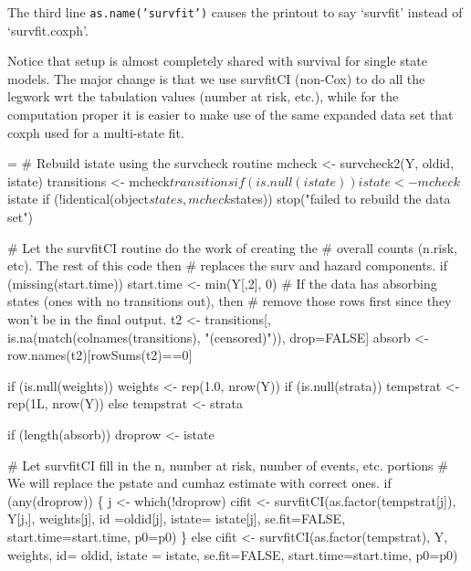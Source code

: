 \documentclass{article}
\newcommand{\code}[1]{\texttt{#1}}
\begin{document}
The third line \code{as.name('survfit')} causes the printout to say
`survfit' instead of `survfit.coxph'.                              %

Notice that setup is almost completely shared with survival for single state
models.  The major change is that we use survfitCI (non-Cox) to do all the
legwork wrt the tabulation values (number at risk, etc.),
while for the computation proper it is easier to make use of the same
expanded data set that coxph used for a multi-state fit.

\begin{nwchunk}
=
 # Rebuild istate using the survcheck routine
 mcheck <- survcheck2(Y, oldid, istate)
 transitions <- mcheck$transitions
 if (is.null(istate)) istate <- mcheck$istate
 if (!identical(object$states, mcheck$states))
     stop("failed to rebuild the data set")
 
 # Let the survfitCI routine do the work of creating the
 #  overall counts (n.risk, etc).  The rest of this code then
 #  replaces the surv and hazard components.
 if (missing(start.time)) start.time <- min(Y[,2], 0)
 # If the data has absorbing states (ones with no transitions out), then
 #  remove those rows first since they won't be in the final output.
 t2 <- transitions[, is.na(match(colnames(transitions), "(censored)")), drop=FALSE]
 absorb <- row.names(t2)[rowSums(t2)==0]
 
 if (is.null(weights)) weights <- rep(1.0, nrow(Y))
 if (is.null(strata))  tempstrat <- rep(1L, nrow(Y))
 else                  tempstrat <- strata
 
 if (length(absorb)) droprow <- istate %
 
 # Let survfitCI fill in the n, number at risk, number of events, etc. portions
 # We will replace the pstate and cumhaz estimate with correct ones.
 if (any(droprow)) \{
     j <- which(!droprow)
     cifit <- survfitCI(as.factor(tempstrat[j]), Y[j,], weights[j], 
                        id =oldid[j], istate= istate[j],
                        se.fit=FALSE, start.time=start.time, p0=p0)
     \}
 else cifit <- survfitCI(as.factor(tempstrat), Y, weights, 
                         id= oldid, istate = istate, se.fit=FALSE, 
                         start.time=start.time, p0=p0)
 

\end{nwchunk}
\end{document}
